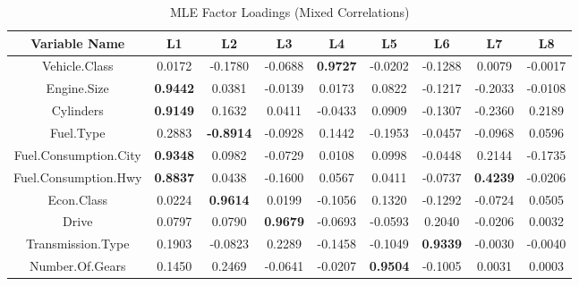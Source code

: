 \documentclass[11pt]{article}
\begin{document}
\begin{table}[ht!]
\centering
\small
\begin{tabular}{c | c c c c c c c c} 
\hline
Variable Name               &  L1 &  L2 &  L3 &  L4 &   L5 &  L6 & L7 & L8\\
\hline
Vehicle.Class              & 0.0172 & -0.1780 & -0.0688 &  \textbf{0.9727} & -0.0202 & -0.1288 &  0.0079 & -0.0017\\
Engine.Size                & \textbf{0.9442} &  0.0381 & -0.0139 &  0.0173 &  0.0822 & -0.1217 & -0.2033 & -0.0108\\
Cylinders                  & \textbf{0.9149} &  0.1632 &  0.0411 & -0.0433 &  0.0909 & -0.1307 & -0.2360 &  0.2189\\
Fuel.Type                  & 0.2883 & \textbf{-0.8914} & -0.0928 &  0.1442 & -0.1953 & -0.0457 & -0.0968 &  0.0596\\
Fuel.Consumption.City      & \textbf{0.9348} &  0.0982 & -0.0729 &  0.0108 &  0.0998 & -0.0448 &  0.2144 & -0.1735\\
Fuel.Consumption.Hwy       & \textbf{0.8837} &  0.0438 & -0.1600 &  0.0567 &  0.0411 & -0.0737 &  \textbf{0.4239} & -0.0206\\
Econ.Class                 & 0.0224 &  \textbf{0.9614} &  0.0199 & -0.1056 &  0.1320 & -0.1292 & -0.0724 &  0.0505\\
Drive                      & 0.0797 &  0.0790 &  \textbf{0.9679} & -0.0693 & -0.0593 &  0.2040 & -0.0206 &  0.0032\\
Transmission.Type          & 0.1903 & -0.0823 &  0.2289 & -0.1458 & -0.1049 &  \textbf{0.9339} & -0.0030 & -0.0040\\
Number.Of.Gears            & 0.1450 &  0.2469 & -0.0641 & -0.0207 &  \textbf{0.9504} & -0.1005 &  0.0031 &  0.0003\\
\hline  
\end{tabular}
\caption{MLE Factor Loadings (Mixed Correlations)}
\end{table}
\end{document}
